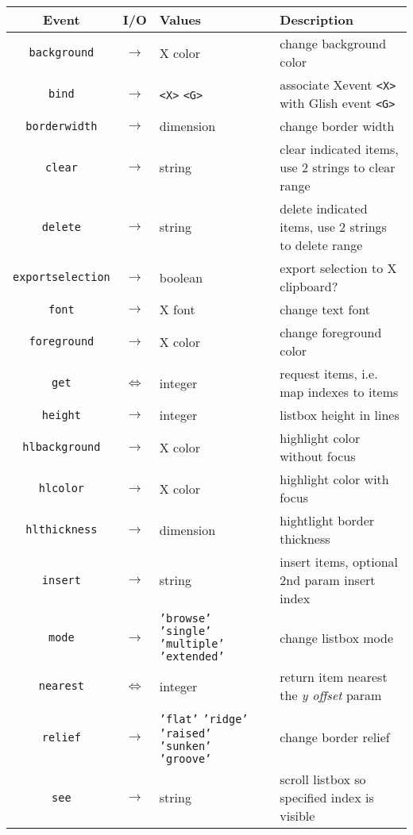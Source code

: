 \begin{table}[tbh]
{\small
\begin{center}
\begin{tabular}{|c|c|p{0.7in}|p{3.1in}|}
\hline
Event & I/O & Values & Description \\
\hline
\hline
{\tt background}&$\rightarrow$& X color & change background color \\ \hline
{\tt bind}	&$\rightarrow$&\verb+<X>+ \verb+<G>+& associate Xevent \verb+<X>+ with Glish event \verb+<G>+ \\ \hline
{\tt borderwidth}&$\rightarrow$& dimension & change border width \\ \hline
{\tt clear}	&$\rightarrow$&string& clear indicated items, use 2 strings to clear range \\ \hline
{\tt delete}	&$\rightarrow$&string& delete indicated items, use 2 strings to delete range \\ \hline
{\tt exportselection} &$\rightarrow$&boolean& export selection to X clipboard? \\ \hline
{\tt font}	&$\rightarrow$& X font & change text font \\ \hline
{\tt foreground}&$\rightarrow$& X color & change foreground color \\ \hline
{\tt get}	&$\Leftrightarrow$&integer& request items, i.e. map indexes to items \\ \hline
{\tt height}	&$\rightarrow$&integer& listbox height in lines \\ \hline
{\tt hlbackground}&$\rightarrow$& X color & highlight color without focus \\ \hline
{\tt hlcolor}	&$\rightarrow$& X color & highlight color with focus \\ \hline
{\tt hlthickness}&$\rightarrow$& dimension & hightlight border thickness \\ \hline
{\tt insert}	&$\rightarrow$&string& insert items, optional 2nd param insert index \\ \hline
{\tt mode}	&$\rightarrow$&{\tt 'browse'} {\tt 'single'} {\tt 'multiple'} {\tt 'extended'} & change listbox mode \\ \hline
{\tt nearest}	&$\Leftrightarrow$&integer& return item nearest the {\em y offset} param \\ \hline
{\tt relief}	&$\rightarrow$& {\tt 'flat'} {\tt 'ridge'} {\tt 'raised'} {\tt 'sunken'} {\tt 'groove'} & change border relief \\ \hline
{\tt see}	&$\rightarrow$&string& scroll listbox so specified index is visible \\ \hline

\end{tabular}
\end{center}}
\end{table}
